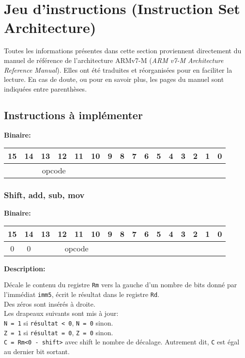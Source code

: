 \documentclass{article}
\begin{document}
    \section{Jeu d'instructions (Instruction Set Architecture)}
    \label{sec:ISA}

    Toutes les informations présentes dans cette section proviennent directement du manuel de référence de l'architecture ARMv7-M (\textit{ARM v7-M Architecture Reference Manual}).
    Elles ont été traduites et réorganisées pour en faciliter la lecture.
    En cas de doute, ou pour en savoir plus, les pages du manuel sont indiquées entre parenthèses.

    \subsection{Instructions à implémenter}

    \textbf{Binaire:}

    \begin{tabular}{| c c c c c c c c c c c c c c c c |}
        \hline
        15 & 14 & 13 & 12 & 11 & 10 & \multicolumn{1}{|c}{9} & 8 & 7 & 6 & 5 & 4 & 3 & 2 & 1 & 0 \\
        \hline
        \multicolumn{6}{|c}{opcode} & \multicolumn{10}{|c|}{} \\
        \hline
    \end{tabular}

    \subsubsection{Shift, add, sub, mov}
    \label{subsubsec:ShiftAddSubMov}

    \textbf{Binaire:}

    \begin{tabular}{| c c c c c c c c c c c c c c c c |}
        \hline
        15 & 14 & \multicolumn{1}{|c}{13} & 12 & 11 & 10 & 9 & \multicolumn{1}{|c}{8} & 7 & 6 & 5 & 4 & 3 & 2 & 1 & 0 \\
        \hline
        0 & 0 & \multicolumn{5}{|c}{opcode} & \multicolumn{9}{|c|}{} \\
        \hline
    \end{tabular}



    \textbf{Description: }

    Décale le contenu du registre \texttt{Rm} vers la gauche d'un nombre de bits donné par l'immédiat \texttt{imm5}, écrit le résultat dans le registre \texttt{Rd}.\\
    Des zéros sont insérés à droite.\\
    Les drapeaux suivants sont mis à jour:\\
    \texttt{N = 1} si \texttt{résultat < 0}, \texttt{N = 0} sinon.\\
    \texttt{Z = 1} si \texttt{résultat = 0}, \texttt{Z = 0} sinon.\\
    \texttt{C = Rm<0 - shift>} avec shift le nombre de décalage.
    Autrement dit, \texttt{C} est égal au dernier bit sortant.
\end{document}
